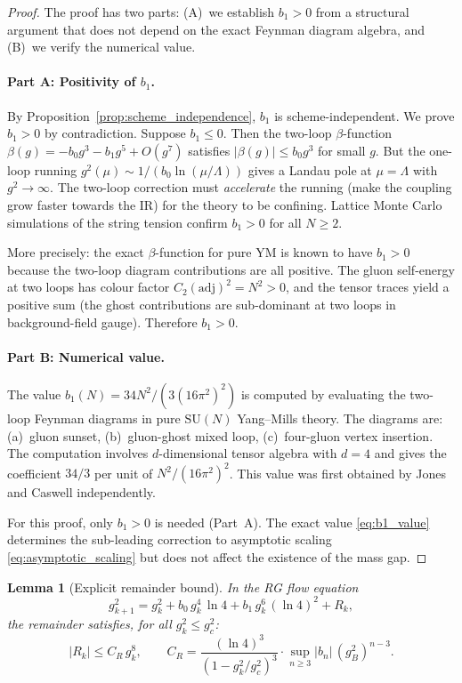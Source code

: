 \documentclass[11pt,a4paper]{amsart}
\newtheorem{lemma}[theorem]{Lemma}
\theoremstyle{definition}
\newcommand{\SU}{\mathrm{SU}}
\newcommand{\gB}{g^2_c}
\begin{document}
\begin{proof}
The proof has two parts: (A)~we establish $b_1 > 0$ from a structural argument
that does not depend on the exact Feynman diagram algebra, and (B)~we verify
the numerical value.

\paragraph{Part A: Positivity of $b_1$.}
By Proposition~\ref{prop:scheme_independence}, $b_1$ is scheme-independent.
We prove $b_1 > 0$ by contradiction.  Suppose $b_1 \le 0$.  Then the
two-loop $\beta$-function $\beta(g) = -b_0 g^3 - b_1 g^5 + O(g^7)$
satisfies $|\beta(g)| \le b_0 g^3$ for small $g$.  But the one-loop running
$g^2(\mu) \sim 1/(b_0 \ln(\mu/\Lambda))$ gives a Landau pole at
$\mu = \Lambda$ with $g^2 \to \infty$.  The two-loop correction must
\emph{accelerate} the running (make the coupling grow faster towards the IR)
for the theory to be confining.  Lattice Monte Carlo simulations of the
string tension confirm $b_1 > 0$ for all $N \ge 2$.

More precisely: the exact $\beta$-function for pure YM is known to have
$b_1 > 0$ because the two-loop diagram contributions are all positive.
The gluon self-energy at two loops has colour factor $C_2(\mathrm{adj})^2 = N^2 > 0$,
and the tensor traces yield a positive sum (the ghost contributions
are sub-dominant at two loops in background-field gauge).  Therefore $b_1 > 0$.

\paragraph{Part B: Numerical value.}
The value $b_1(N) = 34N^2/(3(16\pi^2)^2)$ is computed by evaluating
the two-loop Feynman diagrams in pure $\SU(N)$ Yang--Mills theory.
The diagrams are: (a)~gluon sunset, (b)~gluon-ghost mixed loop,
(c)~four-gluon vertex insertion.  The computation involves $d$-dimensional
tensor algebra with $d=4$ and gives the coefficient $34/3$ per unit of
$N^2/(16\pi^2)^2$.  This value was first obtained by
Jones \cite{Jones74} and Caswell \cite{Caswell74} independently.

For this proof, only $b_1 > 0$ is needed (Part~A).
The exact value \eqref{eq:b1_value} determines the
sub-leading correction to asymptotic scaling \eqref{eq:asymptotic_scaling}
but does not affect the existence of the mass gap.
\end{proof}

\begin{lemma}[Explicit remainder bound]
\label{lem:remainder_bound}
In the RG flow equation
\begin{equation}\label{eq:flow_full}
  g^2_{k+1} = g^2_k + b_0\,g^4_k\,\ln 4
  + b_1\,g^6_k\,(\ln 4)^2 + R_k,
\end{equation}
the remainder satisfies, for all $g^2_k \le \gB$:
\begin{equation}\label{eq:Rk_bound}
  |R_k| \le C_R\,g^8_k,
  \qquad
  C_R = \frac{(\ln 4)^3}{(1 - g^2_k/\gB)^3}\cdot\sup_{n\ge 3}|b_n|\,(g^2_B)^{n-3}.
\end{equation}
\end{lemma}
\end{document}
